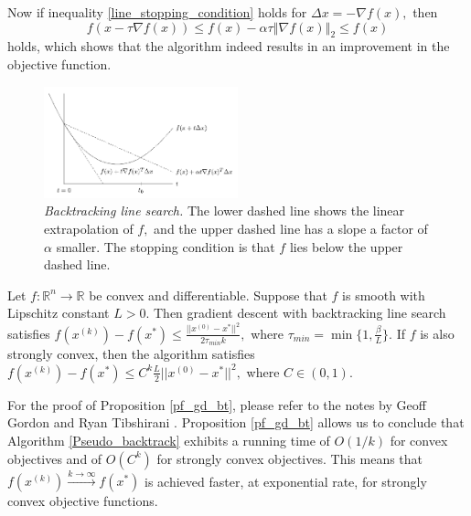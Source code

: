 Now if inequality \eqref{line_stopping_condition} holds for $\Delta x = -\nabla f(x),$ then 
\begin{equation*}\tag{4.2.2.2}\label{objective_imp}
f(x-\tau\nabla f(x))\leq f(x) - \alpha\tau\left\Vert\nabla f(x)\right\Vert_{2} \leq f(x)
\end{equation*}
holds, which shows that the algorithm indeed results in an improvement in the objective function.
\begin{figure}[h!]
    \centering
        \includegraphics[width=0.5\textwidth]{Pictures/line_search.png}
    \caption{\textit{Backtracking line search.} 
 The lower dashed line shows the linear extrapolation of $f,$ and the upper dashed line has a slope a factor of $\alpha$ smaller. The stopping condition is that $f$ lies below the upper dashed line.}\label{fig:line_search}
\end{figure}
\begin{proposition}\textnormal{\cite[10]{GDandLS}}\label{pf_gd_bt}
Let $f:\mathbb{R}^{n}\longrightarrow\mathbb{R}$ be convex and differentiable. Suppose that $f$ is smooth with Lipschitz constant $L > 0.$ Then gradient descent with backtracking line search satisfies $f(x^{(k)})-f(x^{*}) \leq \frac{||x^{(0)}-x^{*}||^{2}}{2\tau_{min} k},$ where $\tau_{min} = \min\{1,\frac{\beta}{L}\}.$ If $f$ is also strongly convex, then the algorithm satisfies $f(x^{(k)})-f(x^{*}) \leq C^{k}\frac{L}{2}||x^{(0)}-x^{*}||^{2},$ where $C\in(0,1).$
\end{proposition}
For the proof of Proposition \ref{pf_gd_bt}, please refer to the notes by Geoff Gordon and Ryan Tibshirani \cite[10]{GDandLS}. Proposition \ref{pf_gd_bt} allows us to conclude that Algorithm \ref{Pseudo_backtrack} exhibits a running time of $O(1/k)$ for convex objectives and of $O(C^{k})$ for strongly convex objectives. This means that $f(x^{(k)}) \xrightarrow{k\rightarrow\infty} f(x^{*})$ is achieved faster, at exponential rate, for strongly convex objective functions. 